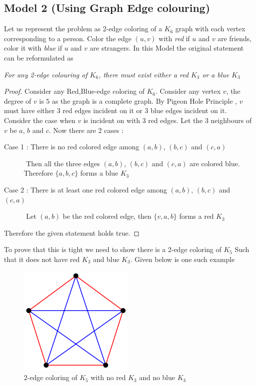 \subsection{Model 2 (Using Graph Edge colouring)}
\begin{description}
   \item[Model]
   Let us represent the problem as 2-edge coloring of a $K_6$ graph with each vertex corresponding to a person. Color the edge $(u,v)$ with \textit{red} if $u$ and $v$ are friends, color it with \textit{blue} if $u$ and $v$ are strangers.
In this Model the original statement can be reformulated as
\item[Statement]
\textit{For any 2-edge colouring of $K_6$, there must exist either  a red $K_3$  or a blue $K_3$ }
\item
\begin{proof}
 Consider any Red,Blue-edge coloring of $K_6$. Consider any vertex $v$, the degree of $v$ is $5$ as the graph is a complete graph. By Pigeon Hole Principle , $v$ must have either $3$ red edges incident on it or $3$ blue edges incident on it. Consider the case when $v$ is incident on with $3$ red edges. Let the 3 neighbours of $v$ be $a$, $b$ and $c$.  Now there are 2 cases :
 \begin{description}
    \item[Case 1 : There is no red colored edge among $(a,b)$, $(b,c)$ and $(c,a)$ ]
    $ $ \newline
    Then all the three edges $(a,b)$, $(b,c)$ and $(c,a)$ are colored blue. Therefore $\{a, b, c\}$ forms a blue $K_3$
    \item[Case 2 : There is at least one red colored edge among $(a,b)$, $(b,c)$ and $(c,a)$ ]
    $ $ \newline
    Let $(a,b)$ be the red colored edge, then $\{v, a, b\}$ forms a red $K_3$
 \end{description}
 Therefore the given statement holds true.
\end{proof}
\item[Proof for tightness]
To prove that this is tight we need to show there is a 2-edge coloring of $K_5$ Such that it does not have red $K_3$ and blue $K_3$. Given below is one such  example
\begin{figure}[h!]
    \centering
    \includegraphics[width=0.2\linewidth]{images/k5counter_example.png}
    \caption{2-edge coloring of $K_5$ with no red $K_3$ and no blue $K_3$}
\end{figure}
\end{description}

